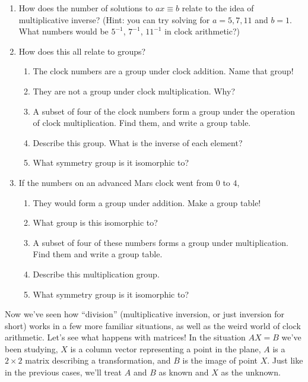 \documentclass[../gatm.tex]{subfiles}
\begin{document}
\begin{enumerate}
\setcounter{enumi}{\value{problem_i}}
\item How does the number of solutions to $ax\equiv b$ relate to the idea of multiplicative inverse? (Hint: you can try solving for $a=5,7,11$ and $b=1$. What numbers would be $5^{-1}$, $7^{-1}$, $11^{-1}$ in clock arithmetic?)
\item How does this all relate to groups?
\begin{enumerate}
\item The clock numbers are a group under clock addition. Name that group!
\item They are not a group under clock multiplication. Why?
\item A subset of four of the clock numbers form a group under the operation of clock multiplication. Find them, and write a group table.
\item Describe this group. What is the inverse of each element?
\item What symmetry group is it isomorphic to?
\end{enumerate}
\item If the numbers on an advanced Mars clock went from $0$ to $4$,
\begin{enumerate}
\item They would form a group under addition. Make a group table!
\item What group is this isomorphic to?
\item A subset of four of these numbers forms a group under multiplication. Find them and write a group table.
\item Describe this multiplication group.
\item What symmetry group is it isomorphic to?
\end{enumerate}
\setcounter{problem_i}{\value{enumi}}
\end{enumerate}

\noindent Now we've seen how ``division'' (multiplicative inversion, or just inversion for short) works in a few more familiar situations, as well as the weird world of clock arithmetic. Let's see what happens with matrices! In the situation $AX=B$ we've been studying, $X$ is a column vector representing a point in the plane, $A$ is a $2\times 2$ matrix describing a transformation, and $B$ is the image of point $X$. Just like in the previous cases, we'll treat $A$ and $B$ as known and $X$ as the unknown.
\end{document}
